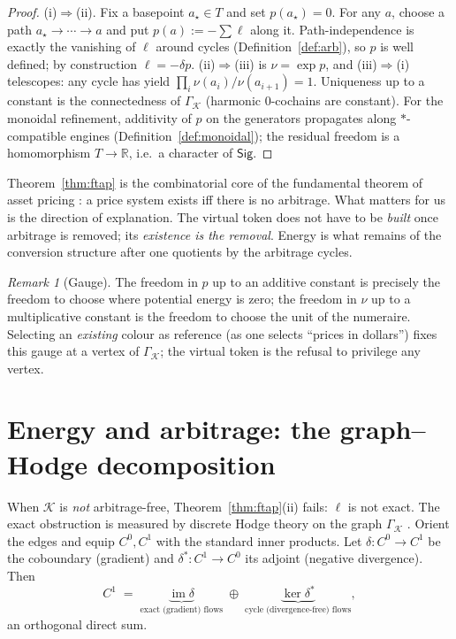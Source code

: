 \documentclass[11pt]{article}
\theoremstyle{definition}
\theoremstyle{plain}
\theoremstyle{remark}
\newtheorem{remark}[definition]{Remark}
\newcommand{\Sig}{\mathsf{Sig}}
\newcommand{\Tok}{T}
\newcommand{\Real}{\mathbb{R}}
\newcommand{\im}{\operatorname{im}}
\begin{document}
\begin{proof}
(i)$\Rightarrow$(ii). Fix a basepoint $a_\star\in\Tok$ and set $p(a_\star)=0$. For any $a$, choose
a path $a_\star\!\to\!\cdots\!\to\! a$ and put $p(a):=-\sum \ell$ along it. Path-independence is
exactly the vanishing of $\ell$ around cycles (Definition~\ref{def:arb}), so $p$ is well defined;
by construction $\ell=-\delta p$. (ii)$\Rightarrow$(iii) is $\nu=\exp p$, and
(iii)$\Rightarrow$(i) telescopes: any cycle has yield
$\prod_i \nu(a_i)/\nu(a_{i+1})=1$. Uniqueness up to a constant is the connectedness of
$\Gamma_{\mathcal K}$ (harmonic $0$-cochains are constant). For the monoidal refinement, additivity
of $p$ on the generators propagates along $\ast$-compatible engines
(Definition~\ref{def:monoidal}); the residual freedom is a homomorphism
$\Tok\to\Real$, i.e.\ a character of $\Sig$.
\end{proof}

Theorem~\ref{thm:ftap} is the combinatorial core of the fundamental theorem of asset pricing
\cite{HK}: a price system exists iff there is no arbitrage. What matters for us is the direction of
explanation. The virtual token does not have to be \emph{built} once arbitrage is removed; its
\emph{existence is the removal}. Energy is what remains of the conversion structure after one
quotients by the arbitrage cycles.

\begin{remark}[Gauge]
The freedom in $p$ up to an additive constant is precisely the freedom to choose where potential
energy is zero; the freedom in $\nu$ up to a multiplicative constant is the freedom to choose the
unit of the numeraire. Selecting an \emph{existing} colour as reference (as one selects
``prices in dollars'') fixes this gauge at a vertex of $\Gamma_{\mathcal K}$; the virtual token is
the refusal to privilege any vertex.
\end{remark}

\section{Energy and arbitrage: the graph--Hodge decomposition}
\label{sec:hodge}

When $\mathcal K$ is \emph{not} arbitrage-free, Theorem~\ref{thm:ftap}(ii) fails: $\ell$ is not
exact. The exact obstruction is measured by discrete Hodge theory on the graph
$\Gamma_{\mathcal K}$ \cite{Hodge}. Orient the edges and equip $C^0,C^1$ with the standard inner
products. Let $\delta:C^0\to C^1$ be the coboundary (gradient) and $\delta^\ast:C^1\to C^0$ its
adjoint (negative divergence). Then
\[
  C^1 \;=\; \underbrace{\im\delta}_{\text{exact (gradient) flows}}
        \;\oplus\; \underbrace{\ker\delta^\ast}_{\text{cycle (divergence-free) flows}} ,
\]
an orthogonal direct sum.
\end{document}
